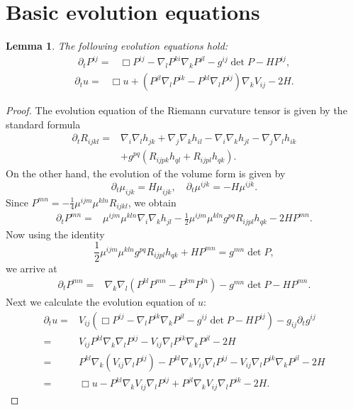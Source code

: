 \documentclass{amsart}
\newtheorem{lemma}[theorem]{Lemma}
\theoremstyle{definition}
\theoremstyle{remark}
\numberwithin{equation}{section}
\begin{document}
\section{Basic evolution equations}
\begin{lemma}\label{ev u}
The following evolution equations hold:
\begin{align}
\partial_tP^{ij}=&\Box P^{ij}-\nabla_lP^{ki}\nabla_kP^{jl}-g^{ij}\det P-HP^{ij},
\end{align}
\begin{align}
\partial_t u=&\Box u+\left(P^{jl}\nabla_lP^{ik}-P^{kl}\nabla_l P^{ij}\right)\nabla_kV_{ij}-2H.
\end{align}
\end{lemma}
\begin{proof}
The evolution equation of the Riemann curvature tensor is given by the standard formula
\begin{align*}
\partial_t R_{ijkl}=&\nabla_i\nabla_lh_{jk}+\nabla_j\nabla_kh_{il}-\nabla_i\nabla_kh_{jl}-\nabla_j\nabla_lh_{ik}\\
&+g^{pq}(R_{ijpk}h_{ql}+R_{ijpl}h_{qk}).
\end{align*}
On the other hand, the evolution of the volume form is given by $$\partial_t\mu_{ijk}=H\mu_{ijk},\quad\partial_t\mu^{ijk}=-H\mu^{ijk}.$$
Since $P^{mn}=-\frac{1}{4}\mu^{ijm}\mu^{kln}R_{ijkl}$, we obtain
\begin{align*}
\partial_tP^{mn}=&\mu^{ijm}\mu^{kln}\nabla_i\nabla_kh_{jl}-\frac{1}{2}\mu^{ijm}\mu^{kln}g^{pq}R_{ijpl}h_{qk}-2HP^{mn}.
\end{align*}
Now using the identity
\[\frac{1}{2}\mu^{ijm}\mu^{kln}g^{pq}R_{ijpl}h_{qk}+HP^{mn}=g^{mn}\det P,\]
we arrive at
\begin{align*}
\partial_tP^{mn}=&\nabla_k\nabla_l(P^{kl}P^{mn}-P^{km}P^{ln})-g^{mn}\det P-HP^{mn}.
\end{align*}
Next we calculate the evolution equation of $u:$
\begin{align*}
\partial_t u=& V_{ij}\left(\Box P^{ij}-\nabla_lP^{ik}\nabla_kP^{jl}-g^{ij}\det P -HP^{ij}\right)- g_{ij}\partial_t g^{ij}\\
=&V_{ij}P^{kl}\nabla_k\nabla_lP^{ij}- V_{ij}\nabla_lP^{ik}\nabla_kP^{jl}-2H\\
=&P^{kl}\nabla_k\left(V_{ij}\nabla_lP^{ij}\right)-P^{kl}\nabla_k V_{ij}\nabla_l P^{ij}-V_{ij}\nabla_lP^{ik}\nabla_kP^{jl}-2H\\
=&\Box u-P^{kl}\nabla_k V_{ij}\nabla_l P^{ij}+P^{jl}\nabla_kV_{ij}\nabla_lP^{ik}-2H.
\end{align*}
\end{proof}
\end{document}
